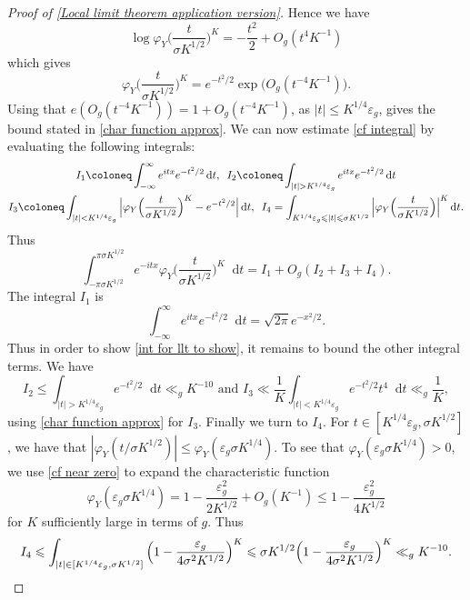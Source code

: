 \documentclass[hidelinks,11pt,reqno]{amsart}
\renewcommand{\leq}{\leqslant}
\newcommand*\dif{\mathop{}\!\mathrm{d}}
\newcommand{\cf}{\varphi_{Y}}
\theoremstyle{remark}
\begin{document}
\begin{proof}[Proof of \cref{Local limit theorem application version}]
    Hence we have
    \[\log \cf\Big(\frac{t}{\sigma K^{1/2}} \Big)^{K}=-\frac{t^{2}}{2}+O_{g}(t^{4}K^{-1})\]
    which gives
    \[\cf\Big(\frac{t}{\sigma K^{1/2}} \Big)^{K}=e^{-t^{2}/2}\exp \big( O_{g}(t^{-4}K^{-1})\big).\]
    Using that $e(O_{g}(t^{-4}K^{-1}))=1+O_{g}(t^{-4}K^{-1})$, as $|t|\leq K^{1/4}\varepsilon_{g}$, gives the bound stated in \cref{char function approx}. We can now estimate \cref{cf integral} by evaluating the following integrals:
    \begin{gather*}I_{1}\coloneq \int_{-\infty}^{\infty }e^{itx}e^{-t^{2}/2}\dif t, \hspace{0.5em}I_{2}\coloneq \int_{|t|>K^{1/4}\varepsilon_{g}}e^{itx}e^{-t^{2}/2}\dif t\\
   I_{3}\coloneq \int_{|t|<K^{1/4}\varepsilon_{g}}\Big | \cf\Big (\frac{t}{\sigma K^{1/2}}\Big )^{K}-e^{-t^{2}/2}\Big |\dif t, \hspace{0.5em} I_{4}=\int_{K^{1/4}\varepsilon_{g}\leq |t|\leq \sigma K^{1/2}}\Big | \cf\Big (\frac{t}{\sigma K^{1/2}}\Big )\Big |^{K}\dif t.\end{gather*}
Thus 
\[ \int_{-\pi\sigma K^{1/2}}^{\pi\sigma K^{1/2}}e^{-itx}\cf\Big(\frac{t}{\sigma K^{1/2}}\Big)^{K}\dif t=I_{1}+O_{g}(I_{2}+I_{3}+I_{4}).\]
The integral $I_{1}$ is 
    \[\int_{-\infty}^{\infty}e^{itx}e^{-t^{2}/2}\dif t=\sqrt{2\pi}e^{-x^{2}/2}.\]
Thus in order to show \cref{int for llt to show}, it remains to bound the other integral terms. We have 
    \[I_{2}\leq \int_{|t|>K^{1/4}\varepsilon_{g}}e^{-t^{2}/2}\dif t\ll_{g} K^{-10} \textrm{ and }I_{3}\ll \frac{1}{K}\int_{|t|<K^{1/4}\varepsilon_{g}}e^{-t^{2}/2}t^{4}\dif t\ll_{g} \frac{1}{K},\]
using \cref{char function approx} for $I_{3}$. Finally we turn to $I_4$. For $t\in [K^{1/4}\varepsilon_{g},\sigma K^{1/2}]$, we have that $|\cf(t/\sigma K^{1/2})|\leq \cf(\varepsilon_{g}\sigma K^{1/4})$. To see that $\cf(\varepsilon_{g}\sigma K^{1/4})>0$, we use \cref{cf near zero} to expand the characteristic function
 \[\cf(\varepsilon_{g}\sigma K^{1/4})=1-\frac{\varepsilon_{g}^{2}}{2K^{1/2}}+O_{g}(K^{-1})\leq 1-\frac{\varepsilon_{g}^{2}}{4K^{1/2}}\]
 for $K$ sufficiently large in terms of $g$. Thus
 \[I_{4}\leq \int_{|t|\in [K^{1/4}\varepsilon_{g},\sigma K^{1/2}]}\Big (1-\frac{\varepsilon_{g}}{4\sigma^{2}K^{1/2}}\Big )^{K}\leq \sigma K^{1/2}\Big(1-\frac{\varepsilon_{g}}{4\sigma^{2}K^{1/2}}\Big )^{K} \ll_{g}K^{-10}. \qedhere\]
 \end{proof}

 
\end{document}
